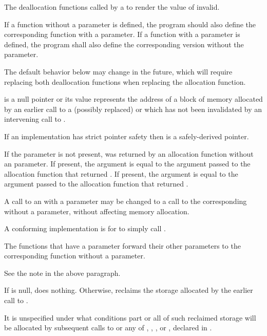 \begin{itemdescr}
\pnum
\effects
The
deallocation functions
called by a
to render the value of  invalid.

\pnum
\replaceable
{}
If a function without a  parameter is defined,
the program should also define
the corresponding function with a  parameter.
If a function with a  parameter is defined,
the program shall also define
the corresponding version without the  parameter.
\begin{note}
The default behavior below may change in the future, which will require
replacing both deallocation functions when replacing the allocation function.
\end{note}

\pnum
\expects
{} is a null pointer or
its value represents the address of
a block of memory allocated by
an earlier call to a (possibly replaced)
or
which has not been invalidated by an intervening call to
.

\pnum
\expects
If an implementation has strict pointer safety
then  is a safely-derived pointer.

\pnum
\expects
If the  parameter is not present,
 was returned by an allocation function
without an  parameter.
If present, the  argument
is equal to the  argument
passed to the allocation function that returned .
If present, the  argument
is equal to the  argument
passed to the allocation function that returned .

\pnum
\required
A call to an 
with a  parameter
may be changed to
a call to the corresponding 
without a  parameter,
without affecting memory allocation.
\begin{note} A conforming implementation is for
 to simply call
. \end{note}

\pnum
{}
The functions that have a  parameter
forward their other parameters
to the corresponding function without a  parameter.
\begin{note} See the note in the above \replaceable paragraph. \end{note}

\pnum
{}
If  is null, does nothing. Otherwise, reclaims the
storage allocated by the earlier call to .

\pnum
\remarks
It is unspecified under what conditions part or all of such
%
reclaimed storage will be allocated by subsequent
calls to
or any of
,
,
,
or
,
declared in
.
\end{itemdescr}

